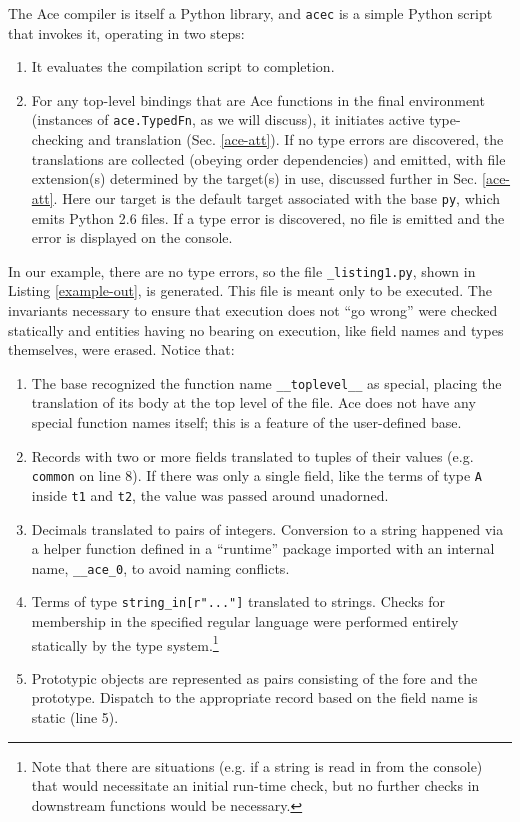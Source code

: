 {The Ace compiler is itself a Python library, and \verb|acec| is a simple Python script that invokes it, operating in two steps:
\begin{enumerate}
\item It evaluates the compilation script to completion.
\item For any top-level bindings that are Ace functions in the final environment (instances of \verb|ace.TypedFn|, as we will discuss), it initiates active type-checking and translation (Sec. \ref{ace-att}). If no type errors are discovered, the translations are collected (obeying order dependencies) and emitted, with file extension(s) determined by the target(s) in use, discussed further in Sec. \ref{ace-att}. Here our target is  the default target associated with the base \verb|py|, which emits Python 2.6 files. If a type error is discovered, no file is emitted and the error is displayed on the console.
\end{enumerate}

In our example, there are no type errors, so the file \verb|_listing1.py|, shown in Listing \ref{example-out},  is generated. This file is meant only to be executed. The invariants necessary to ensure that execution does not ``go wrong'' were checked statically and entities having no bearing on execution, like field names and types themselves, were erased. Notice that:
\begin{enumerate}
\item The base recognized the function name \verb|__toplevel__| as special, placing the translation of its body  at the top level of the file. Ace does not have any special function names itself; this is a feature of the user-defined base.
\item Records with two or more fields translated to tuples of their values (e.g. \verb|common| on line 8). If there was only a single field, like the terms of type \verb|A| inside \verb|t1| and \verb|t2|, the value was passed around unadorned. 
\item Decimals translated to pairs of integers. Conversion to a string happened via a helper function defined in a ``runtime'' package imported with an internal name, \verb|__ace_0|, to avoid naming conflicts. 
\item Terms of type \verb|string_in[r"..."]| translated to strings. Checks for membership in the specified regular language were performed entirely statically by the type system.\footnote{Note that there are situations (e.g. if a string is read in from the console) that would necessitate an initial run-time check, but no further checks in downstream functions would be necessary.}
\item Prototypic objects are represented as pairs consisting of the fore and the prototype. Dispatch to the appropriate record based on the field name is static (line 5).
\end{enumerate}

}
